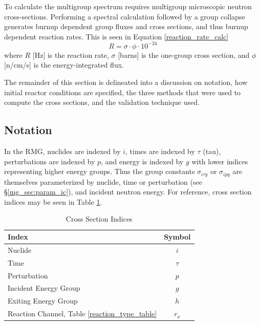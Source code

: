 To calculate the multigroup spectrum requires multigroup microscopic neutron cross-sections.  
Performing a spectral calculation followed by a group collapse generates burnup dependent 
group fluxes and cross sections, and thus burnup dependent reaction rates.
This is seen in Equation \ref{reaction_rate_calc}
\begin{equation}
\label{reaction_rate_calc}
R = \sigma \cdot \phi \cdot 10^{-24}
\end{equation}
where $R$ [Hz] is the reaction rate, $\sigma$ [barns] is the one-group cross section, and
$\phi$ [n/cm/s] is the energy-integrated flux.

The remainder of this section is delineated into a discussion on notation, how initial 
reactor conditions are specified, the three methods that were used to compute the
cross sections, and the validation technique used.




\subsection{Notation}
\label{mg_sec:notation}
In the RMG, nuclides are indexed by $i$, times are indexed by $\tau$ (tau), perturbations are indexed by $p$, 
and energy is indexed by $g$ with lower indices representing higher energy groups.
Thus the group constants $\sigma_{i\tau g}$ or $\sigma_{ipg}$ are themselves parameterized by nuclide, 
time or perturbation (see \S \ref{mg_sec:param_ic}), and incident neutron energy.  
For reference, cross section indices may be seen in Table \ref{rmg_xs_ind}.

\begin{table}[htbp]
\begin{center}
\caption{Cross Section Indices}
\label{rmg_xs_ind}
\begin{tabular}{|l|c|}
\hline
\textbf{Index}        & \textbf{Symbol} \\
\hline
Nuclide               & $i$ \\
Time                  & $\tau$ \\
Perturbation          & $p$ \\
Incident Energy Group & $g$ \\
Exiting Energy Group  & $h$ \\
Reaction Channel, Table \ref{reaction_type_table} & $r_x$ \\
\hline
\end{tabular}
\end{center}
\end{table}



